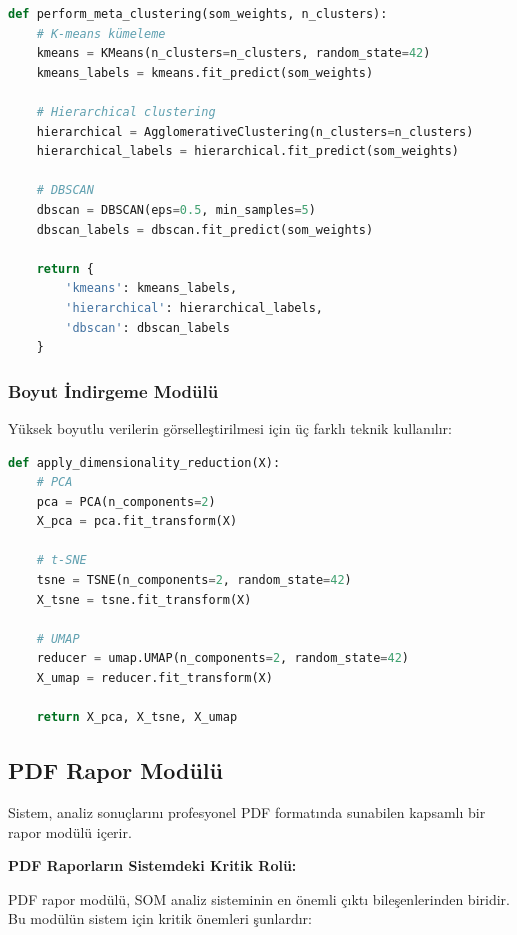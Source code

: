 \begin{lstlisting}[language=python]
def perform_meta_clustering(som_weights, n_clusters):
    # K-means kümeleme
    kmeans = KMeans(n_clusters=n_clusters, random_state=42)
    kmeans_labels = kmeans.fit_predict(som_weights)
    
    # Hierarchical clustering
    hierarchical = AgglomerativeClustering(n_clusters=n_clusters)
    hierarchical_labels = hierarchical.fit_predict(som_weights)
    
    # DBSCAN
    dbscan = DBSCAN(eps=0.5, min_samples=5)
    dbscan_labels = dbscan.fit_predict(som_weights)
    
    return {
        'kmeans': kmeans_labels,
        'hierarchical': hierarchical_labels,
        'dbscan': dbscan_labels
    }
\end{lstlisting}

\subsubsection{Boyut İndirgeme Modülü}

Yüksek boyutlu verilerin görselleştirilmesi için üç farklı teknik kullanılır:

\begin{lstlisting}[language=python]
def apply_dimensionality_reduction(X):
    # PCA
    pca = PCA(n_components=2)
    X_pca = pca.fit_transform(X)
    
    # t-SNE
    tsne = TSNE(n_components=2, random_state=42)
    X_tsne = tsne.fit_transform(X)
    
    # UMAP
    reducer = umap.UMAP(n_components=2, random_state=42)
    X_umap = reducer.fit_transform(X)
    
    return X_pca, X_tsne, X_umap
\end{lstlisting}

\subsection{PDF Rapor Modülü}

Sistem, analiz sonuçlarını profesyonel PDF formatında sunabilen kapsamlı bir rapor modülü içerir.

\textbf{PDF Raporların Sistemdeki Kritik Rolü:}

PDF rapor modülü, SOM analiz sisteminin en önemli çıktı bileşenlerinden biridir. Bu modülün sistem için kritik önemleri şunlardır:

